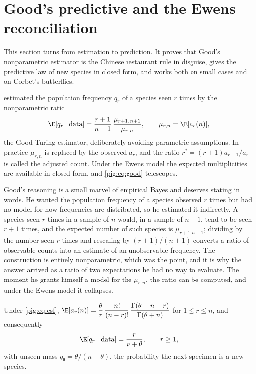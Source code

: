 \section{Good's predictive and the Ewens reconciliation}\label{pig:sec:good}

This section turns from estimation to prediction. It proves that Good's nonparametric estimator is the Chinese restaurant rule in disguise, gives the predictive law of new species in closed form, and works both on small cases and on Corbet's butterflies.

\citet{pig:good1953} estimated the population frequency $q_r$ of a species seen $r$ times by the nonparametric ratio
\begin{equation}\label{pig:eq:good}
\E[q_r\mid\text{data}]=\frac{r+1}{n+1}\,\frac{\mu_{r+1,\,n+1}}{\mu_{r,\,n}},\qquad\mu_{r,n}=\E[a_r(n)],
\end{equation}
the Good Turing estimator, deliberately avoiding parametric assumptions. In practice $\mu_{r,n}$ is replaced by the observed $a_r$, and the ratio $r^*=(r+1)a_{r+1}/a_r$ is called the adjusted count. Under the Ewens model the expected multiplicities are available in closed form, and \eqref{pig:eq:good} telescopes.

Good's reasoning is a small marvel of empirical Bayes and deserves stating in words. He wanted the population frequency of a species observed $r$ times but had no model for how frequencies are distributed, so he estimated it indirectly. A species seen $r$ times in a sample of $n$ would, in a sample of $n+1$, tend to be seen $r+1$ times, and the expected number of such species is $\mu_{r+1,n+1}$; dividing by the number seen $r$ times and rescaling by $(r+1)/(n+1)$ converts a ratio of observable counts into an estimate of an unobservable frequency. The construction is entirely nonparametric, which was the point, and it is why the answer arrived as a ratio of two expectations he had no way to evaluate. The moment he grants himself a model for the $\mu_{r,n}$, the ratio can be computed, and under the Ewens model it collapses.

\begin{proposition}\label{pig:prop:good}
Under \eqref{pig:eq:esf}, $\E[a_r(n)]=\dfrac{\theta}{r}\,\dfrac{n!}{(n-r)!}\,\dfrac{\Gamma(\theta+n-r)}{\Gamma(\theta+n)}$ for $1\le r\le n$, and consequently
\[
\E[q_r\mid\text{data}]=\frac{r}{n+\theta},\qquad r\ge1,
\]
with unseen mass $q_0=\theta/(n+\theta)$, the probability the next specimen is a new species.
\end{proposition}

